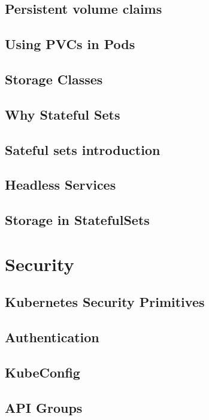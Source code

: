 \documentclass[11pt]{book}
\begin{document}
    \section{Persistent volume claims}

    \section{Using PVCs in Pods}

    \section{Storage Classes}

    \section{Why Stateful Sets}

    \section{Sateful sets introduction}

    \section{Headless Services}

    \section{Storage in StatefulSets}

    \chapter{Security}

    \section{Kubernetes Security Primitives}

    \section{Authentication}

    \section{KubeConfig}

    \section{API Groups}
\end{document}
